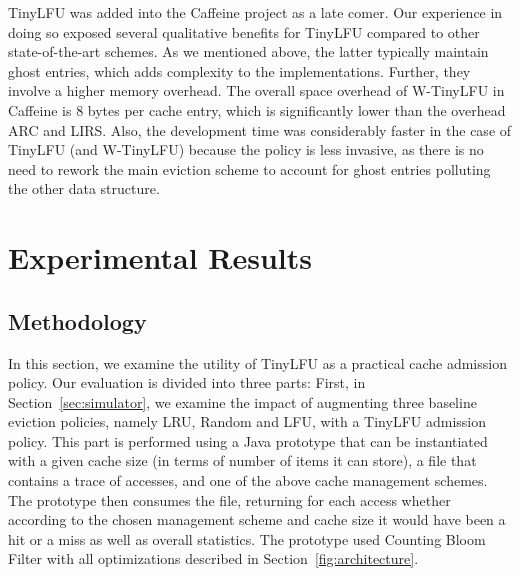 \documentclass[10pt,a4paper]{article}
\begin{document}
TinyLFU was added into the Caffeine project as a late comer.
Our experience in doing so exposed several qualitative benefits for TinyLFU compared to other state-of-the-art schemes.
As we mentioned above, the latter typically maintain ghost entries, which adds complexity to the implementations.
Further, they involve a higher memory overhead.
The overall space overhead of W-TinyLFU in Caffeine is $8$ bytes per cache entry, which is significantly lower than the overhead ARC and LIRS.
Also, the development time was considerably faster in the case of TinyLFU (and W-TinyLFU) because the policy is less invasive, as there is no need to rework the main eviction scheme to account for ghost entries polluting the other data structure.














\section{Experimental Results}
\label{sec:results}

\subsection{Methodology}
\label{sec:method}
In this section, we examine the utility of TinyLFU as a practical cache admission policy.
Our evaluation is divided into three parts:
First, in Section~\ref{sec:simulator}, we examine the impact of augmenting three baseline eviction policies, namely LRU, Random and LFU, with a TinyLFU admission policy.
This part is performed using a Java prototype that can be instantiated with a given cache size (in terms of number of items it can store), a file that contains a trace of accesses, and one of the above cache management schemes.
The prototype then consumes the file, returning for each access whether according to the chosen management scheme and cache size it would have been a hit or a miss as well as overall statistics.
The prototype used Counting Bloom Filter with all optimizations described in Section~\ref{fig:architecture}.
\end{document}
